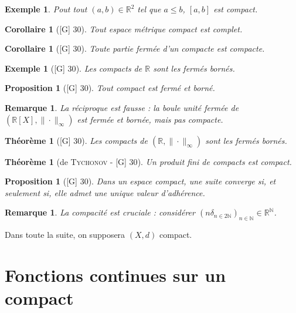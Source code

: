 \documentclass[10pt, a4paper, parskip=full, twoside, twocolumn]{report}
\newtheorem{theorem}[definition]{Théorème}
\newtheorem{proposition}[definition]{Proposition}
\newtheorem{corollary}[definition]{Corollaire}
\newtheorem{example}[definition]{Exemple}
\newtheorem{remark}[definition]{Remarque}
\newcommand{\IN}{\mathbb{N}}
\newcommand{\IR}{\mathbb{R}}
\begin{document}
\begin{example}
	Pout tout $(a,b)\in\IR^2$ tel que $a\leq b$, $[a,b]$ est compact.
\end{example}

\begin{corollary}[\textnormal{[G] 30}]
	Tout espace métrique compact est complet.
\end{corollary}

\begin{corollary}[\textnormal{[G] 30}]
	Toute partie fermée d'un compacte est compacte.
\end{corollary}

\begin{example}[\textnormal{[G] 30}]
	Les compacts de $\IR$ sont les fermés bornés.
\end{example}

\begin{proposition}[\textnormal{[G] 30}]
	Tout compact est fermé et borné.
\end{proposition}

\begin{remark}
	La réciproque est fausse : la boule unité fermée de $(\IR[X], \|\cdot\|_{\infty})$ est fermée et bornée, mais pas compacte.
\end{remark}

\begin{theorem}[\textnormal{[G] 30}]
	Les compacts de $(\IR, \|\cdot\|_{\infty})$ sont les fermés bornés.
\end{theorem}

\begin{theorem}[de \textsc{Tychonov} - \textnormal{[G] 30}]
	Un produit fini de compacts est compact.
\end{theorem}

\begin{proposition}[\textnormal{[G] 30}]
	Dans un espace compact, une suite converge si, et seulement si, elle admet une unique valeur d'adhérence.
\end{proposition}

\begin{remark}
	La compacité est cruciale : considérer $\left(n\delta_{n\in 2\IN}\right)_{n\in\IN}\in\IR^{\IN}$.
\end{remark}

\textcolor{paragraphtext}{Dans toute la suite, on supposera $(X,d)$ compact.}
\section*{Fonctions continues sur un compact}
\end{document}
